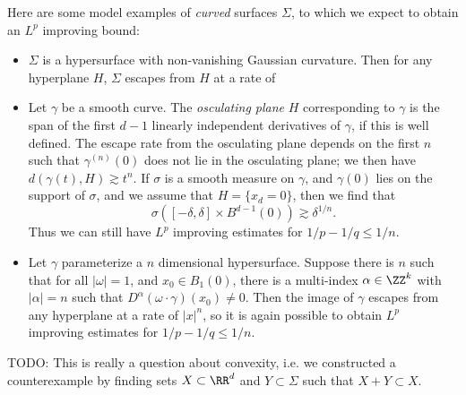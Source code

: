 Here are some model examples of \emph{curved} surfaces $\Sigma$, to which we expect to obtain an $L^p$ improving bound:
%
\begin{itemize}
    \item $\Sigma$ is a hypersurface with non-vanishing Gaussian curvature. Then for any hyperplane $H$, $\Sigma$ escapes from $H$ at a rate of

    \item Let $\gamma$ be a smooth curve. The \emph{osculating plane} $H$ corresponding to $\gamma$ is the span of the first $d-1$ linearly independent derivatives of $\gamma$, if this is well defined. The escape rate from the osculating plane depends on the first $n$ such that $\gamma^{(n)}(0)$ does not lie in the osculating plane; we then have $d(\gamma(t), H) \gtrsim t^n$. If $\sigma$ is a smooth measure on $\gamma$, and $\gamma(0)$ lies on the support of $\sigma$, and we assume that $H = \{ x_d = 0 \}$, then we find that
    \[ \sigma([-\delta,\delta] \times B^{d-1}(0)) \gtrsim \delta^{1/n}. \]
    Thus we can still have $L^p$ improving estimates for $1/p - 1/q \leq 1/n$.

    \item Let $\gamma$ parameterize a $n$ dimensional hypersurface. Suppose there is $n$ such that for all $|\omega| = 1$, and $x_0 \in B_1(0)$, there is a multi-index $\alpha \in \ZZ^k$ with $|\alpha|  = n$ such that $D^\alpha(\omega \cdot \gamma)(x_0) \neq 0$. Then the image of $\gamma$ escapes from any hyperplane at a rate of $|x|^n$, so it is again possible to obtain $L^p$ improving estimates for $1/p - 1/q \leq 1/n$.
\end{itemize}

TODO: This is really a question about convexity, i.e. we constructed a counterexample by finding sets $X \subset \RR^d$ and $Y \subset \Sigma$ such that $X + Y \subset X$.

